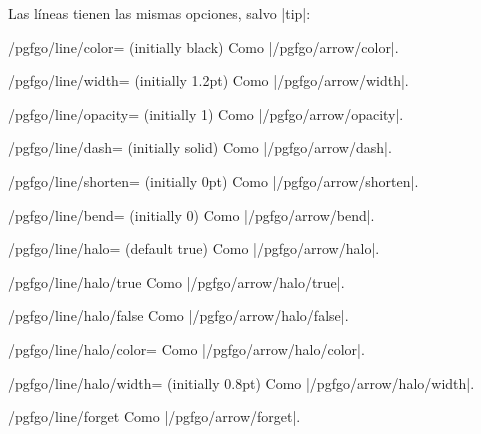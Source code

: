 Las líneas tienen las mismas opciones, salvo |tip|:

\begin{key}{/pgfgo/line/color= (initially black)}
	Como |/pgfgo/arrow/color|.
\end{key}

\begin{key}{/pgfgo/line/width= (initially 1.2pt)}
	Como |/pgfgo/arrow/width|.
\end{key}

\begin{key}{/pgfgo/line/opacity= (initially 1)}
	Como |/pgfgo/arrow/opacity|.
\end{key}

\begin{key}{/pgfgo/line/dash= (initially solid)}
	Como |/pgfgo/arrow/dash|.
\end{key}

\begin{key}{/pgfgo/line/shorten= (initially 0pt)}
	Como |/pgfgo/arrow/shorten|.
\end{key}

\begin{key}{/pgfgo/line/bend= (initially 0)}
	Como |/pgfgo/arrow/bend|.
\end{key}

\begin{key}{/pgfgo/line/halo= (default true)}
	Como |/pgfgo/arrow/halo|.
\end{key}

\begin{stylekey}{/pgfgo/line/halo/true}
	Como |/pgfgo/arrow/halo/true|.
\end{stylekey}

\begin{stylekey}{/pgfgo/line/halo/false}
	Como |/pgfgo/arrow/halo/false|.
\end{stylekey}

\begin{key}{/pgfgo/line/halo/color=}
	Como |/pgfgo/arrow/halo/color|.
\end{key}

\begin{key}{/pgfgo/line/halo/width= (initially 0.8pt)}
	Como |/pgfgo/arrow/halo/width|.
\end{key}

\begin{key}{/pgfgo/line/forget}
	Como |/pgfgo/arrow/forget|.
\end{key}

